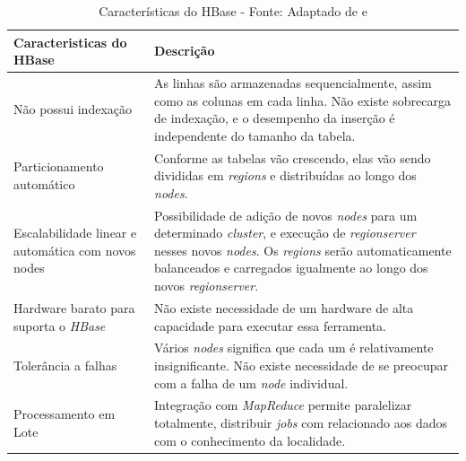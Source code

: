             \begin{table}[!ht]
            \begin{center}
              \begin{tabular}{|p{8cm}|p{8cm}|}
                \hline
                Caracteristicas do HBase & Descrição
                \\ \hline
                Não possui indexação & As linhas são armazenadas sequencialmente,
                                                        assim como as colunas em cada linha. Não existe
                                                        sobrecarga de indexação, e o desempenho da
                                                        inserção é independente do tamanho da tabela.
                \\ \hline
                Particionamento automático & Conforme as tabelas vão crescendo, elas vão sendo divididas em
                                                                    \textit{regions} e distribuídas ao longo dos \textit{nodes}.
                \\ \hline
                Escalabilidade linear e automática com novos nodes & Possibilidade de adição de novos \textit{nodes} para um
                                                                                                          determinado \textit{cluster}, e execução de \textit{regionserver}
                                                                                                          nesses novos \textit{nodes}. Os \textit{regions} serão
                                                                                                          automaticamente balanceados e carregados igualmente ao longo
                                                                                                          dos novos \textit{regionserver}.
                \\ \hline
                Hardware barato para suporta o \textit{HBase} & Não existe necessidade de um hardware de alta capacidade
                                                                                                  para executar essa ferramenta.
                \\ \hline
                Tolerância a falhas & Vários \textit{nodes} significa que cada um é relativamente insignificante. Não existe
                                                    necessidade de se preocupar com a falha de um \textit{node} individual.
                \\ \hline
                Processamento em Lote & Integração com \textit{MapReduce} permite paralelizar totalmente,
                                                            distribuir \textit{jobs} com relacionado aos dados com o conhecimento da localidade.
                \\ \hline
              \end{tabular}
              \caption[Características do HBase]{Características do HBase -
              \protect Fonte: Adaptado de \cite{white2015} e \cite{george2011}}
            \label{tabela1}
            \end{center}
            \end{table}



